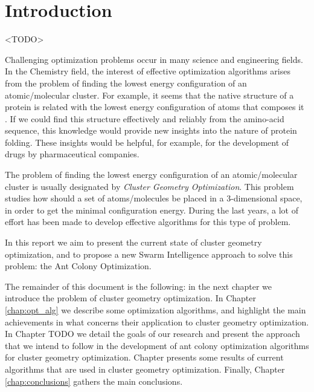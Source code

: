 \chapter{Introduction}

<TODO>

Challenging optimization problems occur in many science and engineering fields. In the Chemistry field, the interest of effective optimization algorithms arises from the problem of finding the lowest energy configuration of an atomic/molecular cluster. For example, it seems that the native structure of a protein is related with the lowest energy configuration of atoms that composes it \cite{wales97}. If we could find this structure effectively and reliably from the amino-acid sequence, this knowledge would provide new insights into the nature of protein folding. These insights would be helpful, for example, for the development of drugs by pharmaceutical companies.

The problem of finding the lowest energy configuration of an atomic/molecular cluster is usually designated by \emph{Cluster Geometry Optimization}. This problem studies how should a set of atoms/molecules be placed in a 3-dimensional space, in order to get the minimal configuration energy. During the last years, a lot of effort has been made to develop effective algorithms for this type of problem.

In this report we aim to present the current state of cluster geometry optimization, and to propose a new Swarm Intelligence approach to solve this problem: the Ant Colony Optimization.

The remainder of this document is the following: in the next chapter we introduce the problem of cluster geometry optimization. In Chapter \ref{chap:opt_alg} we describe some optimization algorithms, and highlight the main achievements in what concerns their application to cluster geometry optimization. In Chapter TODO we detail the goals of our research and present the approach that we intend to follow in the development of ant colony optimization algorithms for cluster geometry optimization. Chapter presents some results of current algorithms that are used in cluster geometry optimization. Finally, Chapter \ref{chap:conclusions} gathers the main conclusions.



